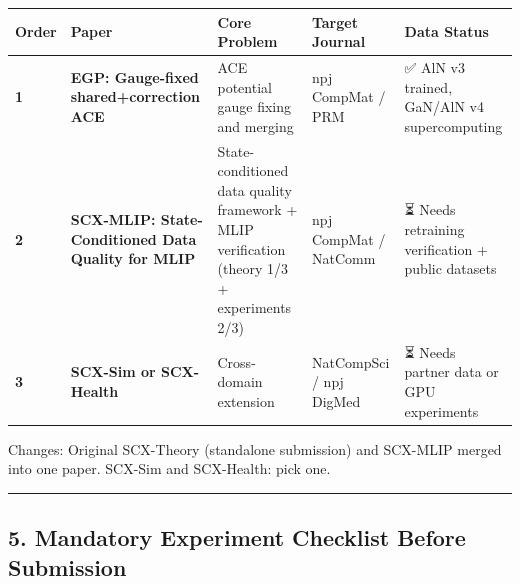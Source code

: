 \documentclass[
  12pt,
]{article}
\begin{document}
\begin{longtable}[]{@{}
  >{\raggedright\arraybackslash}p{}
  >{\raggedright\arraybackslash}p{}
  >{\raggedright\arraybackslash}p{}
  >{\raggedright\arraybackslash}p{}
  >{\raggedright\arraybackslash}p{}@{}}
\toprule\noalign{}
\begin{minipage}[b]{\linewidth}\raggedright
Order
\end{minipage} & \begin{minipage}[b]{\linewidth}\raggedright
Paper
\end{minipage} & \begin{minipage}[b]{\linewidth}\raggedright
Core Problem
\end{minipage} & \begin{minipage}[b]{\linewidth}\raggedright
Target Journal
\end{minipage} & \begin{minipage}[b]{\linewidth}\raggedright
Data Status
\end{minipage} \\
\midrule\noalign{}
\endhead
\bottomrule\noalign{}
\endlastfoot
\textbf{1} & \textbf{EGP: Gauge-fixed shared+correction ACE} & ACE potential gauge fixing and merging & npj CompMat / PRM & ✅ AlN v3 trained, GaN/AlN v4 supercomputing \\
\textbf{2} & \textbf{SCX-MLIP: State-Conditioned Data Quality for MLIP} & State-conditioned data quality framework + MLIP verification (theory 1/3 + experiments 2/3) & npj CompMat / NatComm & ⏳ Needs retraining verification + public datasets \\
\textbf{3} & \textbf{SCX-Sim or SCX-Health} & Cross-domain extension & NatCompSci / npj DigMed & ⏳ Needs partner data or GPU experiments \\
\end{longtable}

Changes: Original SCX-Theory (standalone submission) and SCX-MLIP merged into one paper. SCX-Sim and SCX-Health: pick one.

\begin{center}\rule{0.5\linewidth}{0.5pt}\end{center}

\subsection{5. Mandatory Experiment Checklist Before Submission}\label{mandatory-experiment-checklist}
\end{document}
